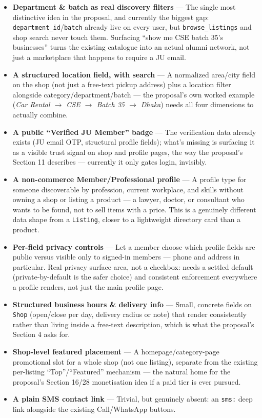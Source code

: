 \documentclass[11pt]{article}
\newcommand{\feature}[2]{%
  \item \textbf{#1} --- #2
}
\begin{document}
\begin{itemize}
  \feature{Department \& batch as real discovery filters}{The single most distinctive idea in the proposal, and currently the biggest gap: \texttt{department\_id}/\texttt{batch} already live on every user, but \texttt{browse\_listings} and shop search never touch them. Surfacing ``show me CSE batch 35's businesses'' turns the existing catalogue into an actual alumni network, not just a marketplace that happens to require a JU email.}
  \feature{A structured location field, with search}{A normalized area/city field on the shop (not just a free-text pickup address) plus a location filter alongside category/department/batch --- the proposal's own worked example (\emph{Car Rental $\to$ CSE $\to$ Batch 35 $\to$ Dhaka}) needs all four dimensions to actually combine.}
  \feature{A public ``Verified JU Member'' badge}{The verification data already exists (JU email OTP, structural profile fields); what's missing is surfacing it as a visible trust signal on shop and profile pages, the way the proposal's Section 11 describes --- currently it only gates login, invisibly.}
  \feature{A non-commerce Member/Professional profile}{A profile type for someone discoverable by profession, current workplace, and skills without owning a shop or listing a product --- a lawyer, doctor, or consultant who wants to be found, not to sell items with a price. This is a genuinely different data shape from a \texttt{Listing}, closer to a lightweight directory card than a product.}
  \feature{Per-field privacy controls}{Let a member choose which profile fields are public versus visible only to signed-in members --- phone and address in particular. Real privacy surface area, not a checkbox: needs a settled default (private-by-default is the safer choice) and consistent enforcement everywhere a profile renders, not just the main profile page.}
  \feature{Structured business hours \& delivery info}{Small, concrete fields on \texttt{Shop} (open/close per day, delivery radius or note) that render consistently rather than living inside a free-text description, which is what the proposal's Section 4 asks for.}
  \feature{Shop-level featured placement}{A homepage/category-page promotional slot for a whole shop (not one listing), separate from the existing per-listing ``Top''/``Featured'' mechanism --- the natural home for the proposal's Section 16/28 monetisation idea if a paid tier is ever pursued.}
  \feature{A plain SMS contact link}{Trivial, but genuinely absent: an \texttt{sms:} deep link alongside the existing Call/WhatsApp buttons.}
\end{itemize}
\end{document}
